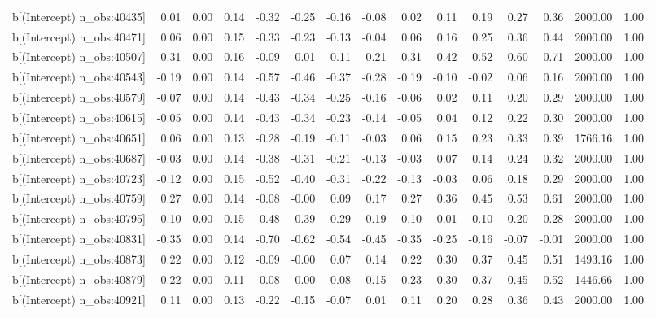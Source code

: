\begin{table}[ht]
\begin{tabular}{rrrrrrrrrrrrrrr}
  b[(Intercept) n\_obs:40435] & 0.01 & 0.00 & 0.14 & -0.32 & -0.25 & -0.16 & -0.08 & 0.02 & 0.11 & 0.19 & 0.27 & 0.36 & 2000.00 & 1.00 \\ 
  b[(Intercept) n\_obs:40471] & 0.06 & 0.00 & 0.15 & -0.33 & -0.23 & -0.13 & -0.04 & 0.06 & 0.16 & 0.25 & 0.36 & 0.44 & 2000.00 & 1.00 \\ 
  b[(Intercept) n\_obs:40507] & 0.31 & 0.00 & 0.16 & -0.09 & 0.01 & 0.11 & 0.21 & 0.31 & 0.42 & 0.52 & 0.60 & 0.71 & 2000.00 & 1.00 \\ 
  b[(Intercept) n\_obs:40543] & -0.19 & 0.00 & 0.14 & -0.57 & -0.46 & -0.37 & -0.28 & -0.19 & -0.10 & -0.02 & 0.06 & 0.16 & 2000.00 & 1.00 \\ 
  b[(Intercept) n\_obs:40579] & -0.07 & 0.00 & 0.14 & -0.43 & -0.34 & -0.25 & -0.16 & -0.06 & 0.02 & 0.11 & 0.20 & 0.29 & 2000.00 & 1.00 \\ 
  b[(Intercept) n\_obs:40615] & -0.05 & 0.00 & 0.14 & -0.43 & -0.34 & -0.23 & -0.14 & -0.05 & 0.04 & 0.12 & 0.22 & 0.30 & 2000.00 & 1.00 \\ 
  b[(Intercept) n\_obs:40651] & 0.06 & 0.00 & 0.13 & -0.28 & -0.19 & -0.11 & -0.03 & 0.06 & 0.15 & 0.23 & 0.33 & 0.39 & 1766.16 & 1.00 \\ 
  b[(Intercept) n\_obs:40687] & -0.03 & 0.00 & 0.14 & -0.38 & -0.31 & -0.21 & -0.13 & -0.03 & 0.07 & 0.14 & 0.24 & 0.32 & 2000.00 & 1.00 \\ 
  b[(Intercept) n\_obs:40723] & -0.12 & 0.00 & 0.15 & -0.52 & -0.40 & -0.31 & -0.22 & -0.13 & -0.03 & 0.06 & 0.18 & 0.29 & 2000.00 & 1.00 \\ 
  b[(Intercept) n\_obs:40759] & 0.27 & 0.00 & 0.14 & -0.08 & -0.00 & 0.09 & 0.17 & 0.27 & 0.36 & 0.45 & 0.53 & 0.61 & 2000.00 & 1.00 \\ 
  b[(Intercept) n\_obs:40795] & -0.10 & 0.00 & 0.15 & -0.48 & -0.39 & -0.29 & -0.19 & -0.10 & 0.01 & 0.10 & 0.20 & 0.28 & 2000.00 & 1.00 \\ 
  b[(Intercept) n\_obs:40831] & -0.35 & 0.00 & 0.14 & -0.70 & -0.62 & -0.54 & -0.45 & -0.35 & -0.25 & -0.16 & -0.07 & -0.01 & 2000.00 & 1.00 \\ 
  b[(Intercept) n\_obs:40873] & 0.22 & 0.00 & 0.12 & -0.09 & -0.00 & 0.07 & 0.14 & 0.22 & 0.30 & 0.37 & 0.45 & 0.51 & 1493.16 & 1.00 \\ 
  b[(Intercept) n\_obs:40879] & 0.22 & 0.00 & 0.11 & -0.08 & -0.00 & 0.08 & 0.15 & 0.23 & 0.30 & 0.37 & 0.45 & 0.52 & 1446.66 & 1.00 \\ 
  b[(Intercept) n\_obs:40921] & 0.11 & 0.00 & 0.13 & -0.22 & -0.15 & -0.07 & 0.01 & 0.11 & 0.20 & 0.28 & 0.36 & 0.43 & 2000.00 & 1.00 \\ 

\end{tabular}
\end{table}
